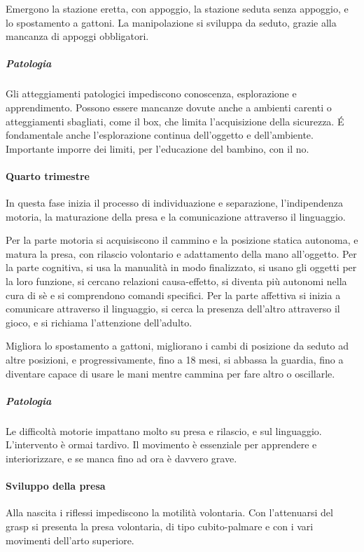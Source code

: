 Emergono la stazione eretta, con appoggio, la stazione seduta senza appoggio, e lo spostamento a gattoni. La manipolazione
si sviluppa da seduto, grazie alla mancanza di appoggi obbligatori.

\subparagraph{Patologia}
Gli atteggiamenti patologici impediscono conoscenza, esplorazione e apprendimento. Possono essere mancanze dovute anche a
ambienti carenti o atteggiamenti sbagliati, come il box, che limita l'acquisizione della sicurezza. \'E fondamentale anche
l'esplorazione continua dell'oggetto e dell'ambiente.
Importante imporre dei limiti, per l'educazione del bambino, con il no.

\paragraph{Quarto trimestre}
In questa fase inizia il processo di individuazione e separazione, l'indipendenza motoria, la maturazione della presa e la
comunicazione attraverso il linguaggio.

Per la parte motoria si acquisiscono il cammino e la posizione statica autonoma, e matura la presa, con rilascio volontario
e adattamento della mano all'oggetto.
Per la parte cognitiva, si usa la manualità in modo finalizzato, si usano gli oggetti per la loro funzione, si cercano
relazioni causa-effetto, si diventa più autonomi nella cura di sè e si comprendono comandi specifici.
Per la parte affettiva si inizia a comunicare attraverso il linguaggio, si cerca la presenza dell'altro attraverso il gioco,
e si richiama l'attenzione dell'adulto.

Migliora lo spostamento a gattoni, migliorano i cambi di posizione da seduto ad altre posizioni, e progressivamente, fino a
18 mesi, si abbassa la guardia, fino a diventare capace di usare le mani mentre cammina per fare altro o oscillarle.

\subparagraph{Patologia}
Le difficoltà motorie impattano molto su presa e rilascio, e sul linguaggio. L'intervento è ormai tardivo. Il movimento è
essenziale per apprendere e interiorizzare, e se manca fino ad ora è davvero grave.

\paragraph{Sviluppo della presa}
Alla nascita i riflessi impediscono la motilità volontaria. Con l'attenuarsi del grasp si presenta la presa volontaria, di
tipo cubito-palmare e con i vari movimenti dell'arto superiore.

